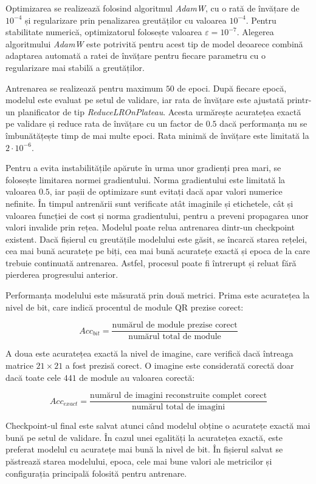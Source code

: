 Optimizarea se realizează folosind algoritmul \textit{AdamW}, cu o rată de învățare de $10^{-4}$ și regularizare prin penalizarea greutăților cu valoarea $10^{-4}$. Pentru stabilitate numerică, optimizatorul folosește valoarea $\varepsilon = 10^{-7}$. Alegerea algoritmului \textit{AdamW} este potrivită pentru acest tip de model deoarece combină adaptarea automată a ratei de învățare pentru fiecare parametru cu o regularizare mai stabilă a greutăților.

Antrenarea se realizează pentru maximum $50$ de epoci. După fiecare epocă, modelul este evaluat pe setul de validare, iar rata de învățare este ajustată printr-un planificator de tip \textit{ReduceLROnPlateau}. Acesta urmărește acuratețea exactă pe validare și reduce rata de învățare cu un factor de $0.5$ dacă performanța nu se îmbunătățește timp de mai multe epoci. Rata minimă de învățare este limitată la $2 \cdot 10^{-6}$.

Pentru a evita instabilitățile apărute în urma unor gradienți prea mari, se folosește limitarea normei gradientului. Norma gradientului este limitată la valoarea $0.5$, iar pașii de optimizare sunt evitați dacă apar valori numerice nefinite. În timpul antrenării sunt verificate atât imaginile și etichetele, cât și valoarea funcției de cost și norma gradientului, pentru a preveni propagarea unor valori invalide prin rețea.
Modelul poate relua antrenarea dintr-un checkpoint existent. Dacă fișierul cu greutățile modelului este găsit, se încarcă starea rețelei, cea mai bună acuratețe pe biți, cea mai bună acuratețe exactă și epoca de la care trebuie continuată antrenarea. Astfel, procesul poate fi întrerupt și reluat fără pierderea progresului anterior.

Performanța modelului este măsurată prin două metrici. Prima este acuratețea la nivel de bit, care indică procentul de module QR prezise corect:

\[
Acc_{bit} =
\frac{\text{numărul de module prezise corect}}
{\text{numărul total de module}}
\]

A doua este acuratețea exactă la nivel de imagine, care verifică dacă întreaga matrice $21 \times 21$ a fost prezisă corect. O imagine este considerată corectă doar dacă toate cele $441$ de module au valoarea corectă:

\[
Acc_{exact} =
\frac{\text{numărul de imagini reconstruite complet corect}}
{\text{numărul total de imagini}}
\]

Checkpoint-ul final este salvat atunci când modelul obține o acuratețe exactă mai bună pe setul de validare. În cazul unei egalități la acuratețea exactă, este preferat modelul cu acuratețe mai bună la nivel de bit. În fișierul salvat se păstrează starea modelului, epoca, cele mai bune valori ale metricilor și configurația principală folosită pentru antrenare.

